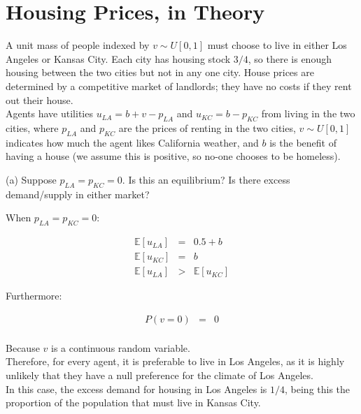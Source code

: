 \section{Housing Prices, in Theory}

A unit mass of people indexed by \( v \sim U[0,1] \) must choose to live in either Los Angeles or Kansas City. Each city has housing stock \( 3/4 \), so there is enough housing between the two cities but not in any one city. House prices are determined by a competitive market of landlords; they have no costs if they rent out their house.\\

Agents have utilities \( u_{LA} = b + v - p_{LA} \) and \( u_{KC} = b - p_{KC} \) from living in the two cities, where \( p_{LA} \) and \( p_{KC} \) are the prices of renting in the two cities, \( v \sim U[0,1] \) indicates how much the agent likes California weather, and \( b \) is the benefit of having a house (we assume this is positive, so no-one chooses to be homeless).



\begin{tcolorbox}
    (a) Suppose \( p_{LA} = p_{KC} = 0 \). Is this an equilibrium? Is there excess demand/supply in either market?
\end{tcolorbox}

When \( p_{LA} = p_{KC} = 0 \):

\begin{eqnarray*}
    \mathbb{E}[u_{LA}] &=& 0.5 + b\\
    \mathbb{E}[u_{KC}] &=& b\\
    \mathbb{E}[u_{LA}] &>& \mathbb{E}[u_{KC}]
\end{eqnarray*}

Furthermore:

\begin{eqnarray*}
    P(v = 0) &=& 0\\
\end{eqnarray*}

Because \(v\) is a continuous random variable.\\

Therefore, for every agent, it is preferable to live in Los Angeles, as it is highly unlikely that they have a null preference for the climate of Los Angeles.\\

In this case, the excess demand for housing in Los Angeles is \(1/4\), being this the proportion of the population that must live in Kansas City.\\

